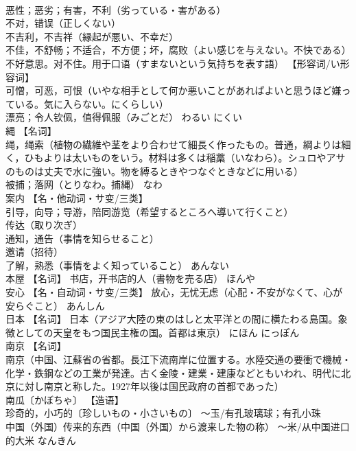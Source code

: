 \documentclass[8pt]{extreport}
\begin{document}
\begin{CJK}{UTF8}{min}
\\	恶性；恶劣；有害，不利（劣っている・害がある） 
\\	不对，错误（正しくない） 
\\	不吉利，不吉祥（縁起が悪い、不幸だ） 
\\	不佳，不舒畅；不适合，不方便；坏，腐败（よい感じを与えない。不快である） 
\\	不好意思。对不住。用于口语（すまないという気持ちを表す語） 【形容词/い形容词】 
\\	可憎，可恶，可恨（いやな相手として何か悪いことがあればよいと思うほど嫌っている。気に入らない。にくらしい） 
\\	漂亮；令人钦佩，值得佩服（みごとだ）	わるい にくい	
\\	縄	【名词】 
\\	绳，绳索（植物の繊維や茎をより合わせて細長く作ったもの。普通，綱よりは細く，ひもよりは太いものをいう。材料は多くは稲藁（いなわら）。シュロやアサのものは丈夫で水に強い。物を縛るときやつなぐときなどに用いる） 
\\	被捕；落网（とりなわ。捕縄）	なわ	
\\	案内	【名・他动词・サ变/三类】 
\\	引导，向导；导游，陪同游览（希望するところへ導いて行くこと） 
\\	传达（取り次ぎ） 
\\	通知，通告（事情を知らせること） 
\\	邀请（招待） 
\\	了解，熟悉（事情をよく知っていること）	あんない	
\\	本屋	【名词】 书店，开书店的人（書物を売る店）	ほんや	
\\	安心	【名・自动词・サ变/三类】 放心，无忧无虑（心配・不安がなくて、心が安らぐこと）	あんしん	
\\	日本	【名词】 日本（アジア大陸の東のはしと太平洋との間に横たわる島国。象徴としての天皇をもつ国民主権の国。首都は東京）	にほん にっぽん	
\\	南京	【名词】 
\\	南京（中国、江蘇省の省都。長江下流南岸に位置する。水陸交通の要衝で機械・化学・鉄鋼などの工業が発達。古く金陵・建業・建康などともいわれ、明代に北京に対し南京と称した。1927年以後は国民政府の首都であった） 
\\	南瓜〔かぼちゃ〕 【造语】 
\\	珍奇的，小巧的〔珍しいもの・小さいもの〕 ～玉/有孔玻璃球；有孔小珠 
\\	中国（外国）传来的东西（中国（外国）から渡来した物の称） ～米/从中国进口的大米	なんきん	

\end{CJK}
\end{document}
